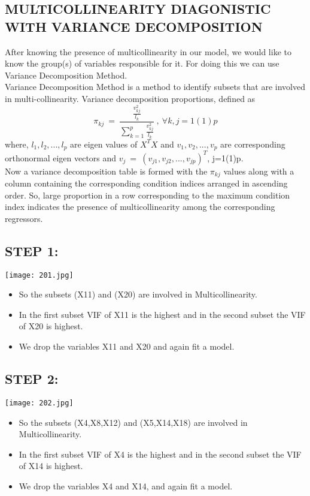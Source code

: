 \documentclass[a4paper,12pt,twoside]{book}
\begin{document}
\subsection{MULTICOLLINEARITY DIAGONISTIC WITH VARIANCE DECOMPOSITION}
After knowing the presence of multicollinearity in our model, we would like to know the group(s) of variables responsible for it. For doing this we can use Variance Decomposition Method.\\
Variance Decomposition Method is a method to identify subsets that are involved in multi-collinearity. Variance decomposition proportions, defined as\\
\[\pi_{kj}\:=\:\frac{\frac{v_{kj}^2}{l_k}}{\sum_{k=1}^p\frac{v_{kj}^2}{l_k}}\:,\:\forall k, j=1(1)p\]
where, $l_1,l_2,...,l_p$ are eigen values of $X^TX$ and $v_1,v_2,...,v_p$ are corresponding orthonormal eigen vectors and $v_j\:=\:(v_{j1},v_{j2},...,v_{jp})^T$, j=1(1)p.\\
Now a variance decomposition table is formed with the $\pi_{kj}$ values along with a column containing the corresponding condition indices arranged in ascending order. So, large proportion in a row corresponding to the maximum condition index indicates the presence of multicollinearity among the corresponding regressors.
\subsection*{STEP 1:}
\begin{center}
\texttt{[image: 201.jpg]}\\
\end{center}
\begin{itemize}
\item So the subsets (X11) and (X20) are involved in Multicollinearity.\\
\item In the first subset VIF of X11 is the highest and in the second subset the VIF of X20 is highest.\\
\item We drop the variables X11 and X20 and again fit a model.\\
\end{itemize}
\subsection*{STEP 2:}
\begin{center}
\texttt{[image: 202.jpg]}\\
\end{center}
\begin{itemize}
\item So the subsets (X4,X8,X12) and (X5,X14,X18) are involved in Multicollinearity.\\
\item In the first subset VIF of X4 is the highest and in the second subset the VIF of X14 is highest.\\
\item We drop the variables X4 and X14, and again fit a model.\\
\end{itemize}
\end{document}
